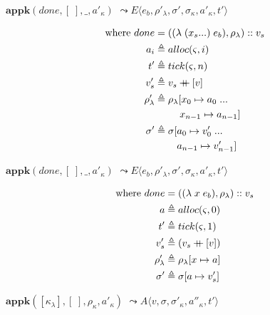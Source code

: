 \documentclass[12pt,draft]{article}
\newcommand\mdoubleplus{\ensuremath{\mathbin{+\mkern-9mu+}}}
\newcommand{\lamsyn}[2]{(\lambda\;(#1 ...)\;#2)}
\newcommand{\vararglamsyn}[2]{(\lambda\;#1\;#2)}
\begin{document}
\begin{multicols*}{2}
\vfill\null
\columnbreak


\begin{center}
  $\textbf{appk}(done, [\;], \_, a'_\kappa)$
  $\leadsto E\langle e_b , \rho'_\lambda , \sigma',\sigma_\kappa,a'_\kappa,t' \rangle$
\end{center}
\vspace{-7mm}
\begin{align*}
  \text{where }
  done &= (\lamsyn{x_s}{e_b}, \rho_{\lambda}) :: v_s \\
  a_i &\triangleq alloc(\varsigma, i) \\
  t' &\triangleq tick(\varsigma, n) \\
  v'_s &\triangleq v_s \mdoubleplus [v] \\
  \rho'_{\lambda} &\triangleq \rho_{\lambda}[x_0 \mapsto a_0 \;... \\
       &\;\;\;\;\;\;\;\;\;x_{n-1} \mapsto a_{n-1}] \\
  \sigma' &\triangleq \sigma[a_0 \mapsto v'_0\;...\\
       &\;\;\;\;\;\;\;\;a_{n-1} \mapsto v'_{n-1}]
\end{align*}
\begin{center}
  $\textbf{appk}(done, [\;], \_, a'_\kappa)$
  $\leadsto E\langle e_b, \rho'_\lambda , \sigma',\sigma_\kappa,a'_\kappa,t' \rangle$
\end{center}
\vspace{-7mm}
\begin{align*}
  \text{where }
  done &= (\vararglamsyn{x}{e_b}, \rho_{\lambda}) :: v_s \\
  a &\triangleq alloc(\varsigma, 0) \\
  t' &\triangleq tick(\varsigma, 1) \\
  v'_s &\triangleq (v_s \mdoubleplus [v]) \\
  \rho'_{\lambda} &\triangleq \rho_{\lambda}[x \mapsto a] \\
  \sigma' &\triangleq \sigma[a \mapsto v'_s]
\end{align*}
\begin{center}
  $\textbf{appk}([\kappa_\lambda] , [\;] , \rho_\kappa , a'_\kappa)$
  $\leadsto A\langle v , \sigma , \sigma'_\kappa,a''_\kappa,t' \rangle$

\end{center}
\end{multicols*}
\end{document}
